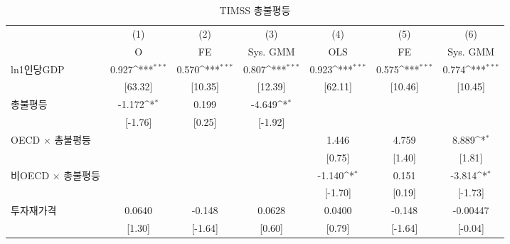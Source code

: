 \begin{table}[htbp]\centering
\def\sym#1{\ifmmode^{#1}\else\(^{#1}\)\fi}
\caption{TIMSS 총불평등\label{tab:timsssimp}}
\begin{tabular}{l*{6}{c}}
\toprule
                    &\multicolumn{1}{c}{(1)}&\multicolumn{1}{c}{(2)}&\multicolumn{1}{c}{(3)}&\multicolumn{1}{c}{(4)}&\multicolumn{1}{c}{(5)}&\multicolumn{1}{c}{(6)}\\
                    &\multicolumn{1}{c}{O}&\multicolumn{1}{c}{FE}&\multicolumn{1}{c}{Sys. GMM}&\multicolumn{1}{c}{OLS}&\multicolumn{1}{c}{FE}&\multicolumn{1}{c}{Sys. GMM}\\
\midrule
ln1인당GDP        &       0.927\sym{***}&       0.570\sym{***}&       0.807\sym{***}&       0.923\sym{***}&       0.575\sym{***}&       0.774\sym{***}\\
                    &     [63.32]         &     [10.35]         &     [12.39]         &     [62.11]         &     [10.46]         &     [10.45]         \\
\addlinespace
총불평등          &      -1.172\sym{*}  &       0.199         &      -4.649\sym{*}  &                     &                     &                     \\
                    &     [-1.76]         &      [0.25]         &     [-1.92]         &                     &                     &                     \\
\addlinespace
OECD $\times$ 총불평등&                     &                     &                     &       1.446         &       4.759         &       8.889\sym{*}  \\
                    &                     &                     &                     &      [0.75]         &      [1.40]         &      [1.81]         \\
\addlinespace
비OECD $\times$ 총불평등&                     &                     &                     &      -1.140\sym{*}  &       0.151         &      -3.814\sym{*}  \\
                    &                     &                     &                     &     [-1.70]         &      [0.19]         &     [-1.73]         \\
\addlinespace
투자재가격        &      0.0640         &      -0.148         &      0.0628         &      0.0400         &      -0.148         &    -0.00447         \\
                    &      [1.30]         &     [-1.64]         &      [0.60]         &      [0.79]         &     [-1.64]         &     [-0.04]         \\

\end{tabular}
\end{table}
